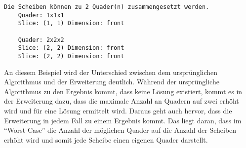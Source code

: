 \documentclass[a4paper,10pt,ngerman]{scrartcl}
\begin{document}
    \begin{lstlisting}[frame=single, title=Programmausgabe zweiQuader.txt, breaklines=true,label={lst:lstlisting4}]
    Die Scheiben können zu 2 Quader(n) zusammengesetzt werden.
    Quader: 1x1x1
    Slice: (1, 1) Dimension: front

    Quader: 2x2x2
    Slice: (2, 2) Dimension: front
    Slice: (2, 2) Dimension: front
    \end{lstlisting}

    An diesem Beispiel wird der Unterschied zwischen dem ursprünglichen Algorithmus und der Erweiterung deutlich.
    Während der ursprüngliche Algorithmus zu den Ergebnis kommt, dass keine Lösung existiert,
    kommt es in der Erweiterung dazu, dass die maximale Anzahl an Quadern auf zwei erhöht wird und für eine Lösung ermittelt wird.
    Daraus geht auch hervor, dass die Erweiterung in jedem Fall zu einem Ergebnis kommt.
    Das liegt daran, dass im ``Worst-Case'' die Anzahl der möglichen Quader auf die Anzahl der Scheiben erhöht wird
    und somit jede Scheibe einen eigenen Quader darstellt.

    \newpage
\end{document}
